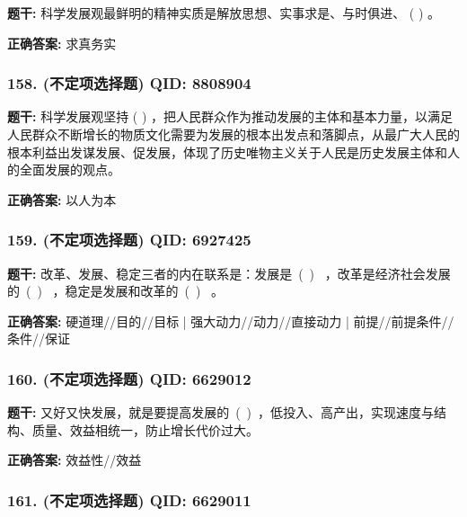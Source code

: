 \documentclass[12pt,UTF8]{ctexart}
\begin{document}
\textbf{题干:}
科学发展观最鲜明的精神实质是解放思想、实事求是、与时俱进、 ( ) 。

\textbf{正确答案:}
求真务实

\vspace{0.3em}\hrulefill\vspace{0.7em}

\subsubsection*{158. (不定项选择题) \small QID: 8808904}

\textbf{题干:}
科学发展观坚持 ( ) ，把人民群众作为推动发展的主体和基本力量，以满足人民群众不断增长的物质文化需要为发展的根本出发点和落脚点，从最广大人民的根本利益出发谋发展、促发展，体现了历史唯物主义关于人民是历史发展主体和人的全面发展的观点。

\textbf{正确答案:}
以人为本

\vspace{0.3em}\hrulefill\vspace{0.7em}

\subsubsection*{159. (不定项选择题) \small QID: 6927425}

\textbf{题干:}
改革、发展、稳定三者的内在联系是：发展是 ( )    ，改革是经济社会发展的 ( )  ，稳定是发展和改革的 ( )    。

\textbf{正确答案:}
硬道理//目的//目标 | 强大动力//动力//直接动力 | 前提//前提条件//条件//保证

\vspace{0.3em}\hrulefill\vspace{0.7em}

\subsubsection*{160. (不定项选择题) \small QID: 6629012}

\textbf{题干:}
又好又快发展，就是要提高发展的 ( ) ，低投入、高产出，实现速度与结构、质量、效益相统一，防止增长代价过大。

\textbf{正确答案:}
效益性//效益

\vspace{0.3em}\hrulefill\vspace{0.7em}

\subsubsection*{161. (不定项选择题) \small QID: 6629011}
\end{document}
